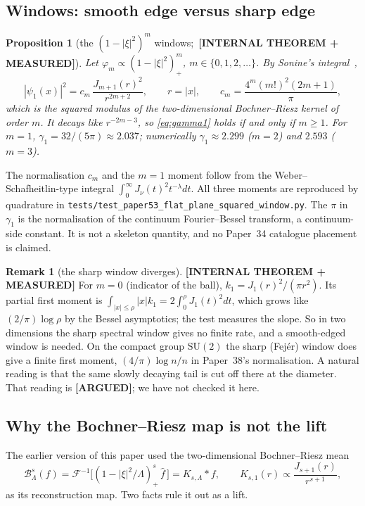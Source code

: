 \documentclass[11pt,a4paper]{article}
\theoremstyle{plain}
\newtheorem{proposition}[theorem]{Proposition}
\theoremstyle{definition}
\newtheorem{remark}[theorem]{Remark}
\newcommand{\Berez}{\mathcal{B}}
\begin{document}
\subsection{Windows: smooth edge versus sharp edge}\label{subsec:windows}
\begin{proposition}[the $(1-|\xi|^{2})^{m}$ windows;\
\textbf{[INTERNAL THEOREM + MEASURED]}]\label{prop:windows}
Let $\varphi_{m}\propto(1-|\xi|^{2})_{+}^{m}$, $m\in\{0,1,2,\dots\}$. By Sonine's
integral~\cite{watson1944},
\[
|\psi_{1}(x)|^{2}=c_{m}\,\frac{J_{m+1}(r)^{2}}{r^{2m+2}},\qquad
r=|x|,\qquad c_{m}=\frac{4^{m}(m!)^{2}(2m+1)}{\pi},
\]
which is the squared modulus of the two-dimensional Bochner--Riesz kernel
of order $m$. It decays like $r^{-2m-3}$, so \eqref{eq:gamma1} holds if and only if
$m\ge1$. For $m=1$, $\gamma_{1}=32/(5\pi)\approx2.037$; numerically
$\gamma_{1}\approx2.299$ ($m=2$) and $2.593$ ($m=3$).
\end{proposition}
The normalisation $c_{m}$ and the $m=1$ moment follow from the
Weber--Schafheitlin-type integral $\int_{0}^{\infty}J_{\nu}(t)^{2}
t^{-\lambda}dt$. All three moments are reproduced by quadrature in
\texttt{tests/test\_paper53\_flat\_plane\_squared\_window.py}. The $\pi$
in $\gamma_{1}$ is the normalisation of the continuum Fourier--Bessel
transform, a continuum-side constant. It is not a skeleton quantity, and
no Paper~34 catalogue placement is claimed.

\begin{remark}[the sharp window diverges]\label{rem:sharp}
\textbf{[INTERNAL THEOREM + MEASURED]} For $m=0$ (indicator of the ball),
$k_{1}=J_{1}(r)^{2}/(\pi r^{2})$. Its partial first moment is
$\int_{|x|\le\rho}|x|k_{1}=2\int_{0}^{\rho}J_{1}(t)^{2}dt$, which grows
like $(2/\pi)\log\rho$ by the Bessel asymptotics; the test measures the
slope. So in two dimensions the sharp spectral window gives no finite
rate, and a smooth-edged window is needed. On the compact group
$\mathrm{SU}(2)$ the sharp (Fej\'er) window does give a finite first moment,
$(4/\pi)\log n/n$ in Paper~38's normalisation. A natural reading is that
the same slowly decaying tail is cut off there at the diameter. That
reading is \textbf{[ARGUED]}; we have not checked it here.
\end{remark}

\subsection{Why the Bochner--Riesz map is not the lift}\label{subsec:not_br}
The earlier version of this paper used the two-dimensional Bochner--Riesz
mean
\begin{equation}\label{eq:plane_berezin}
\Berez_{\Lambda}^{s}(f)=\mathcal F^{-1}\bigl[(1-|\xi|^{2}/\Lambda)_{+}^{s}
\,\widehat f\,\bigr]=K_{s,\Lambda}*f,\qquad
K_{s,1}(r)\propto\frac{J_{s+1}(r)}{r^{s+1}},
\end{equation}
as its reconstruction map. Two facts rule it out as a lift.
\end{document}
